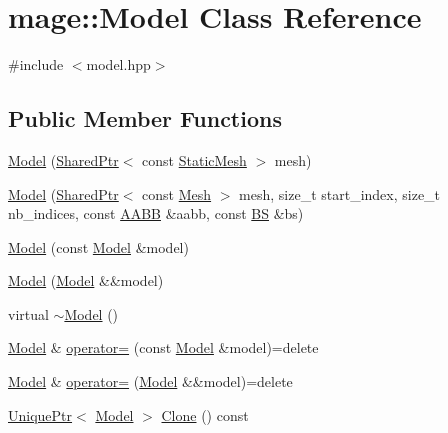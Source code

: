 \hypertarget{classmage_1_1_model}{}\section{mage\+:\+:Model Class Reference}
\label{classmage_1_1_model}


{\ttfamily \#include $<$model.\+hpp$>$}

\subsection*{Public Member Functions}
\begin{DoxyCompactItemize}
\item 
\hyperlink{classmage_1_1_model_a6f67b215aa2db0a593ef7a8ee77fb4d3}{Model} (\hyperlink{namespacemage_a1e01ae66713838a7a67d30e44c67703e}{Shared\+Ptr}$<$ const \hyperlink{classmage_1_1_static_mesh}{Static\+Mesh} $>$ mesh)
\item 
\hyperlink{classmage_1_1_model_aea937d2e26dc5549e1e93d1664b6f3b0}{Model} (\hyperlink{namespacemage_a1e01ae66713838a7a67d30e44c67703e}{Shared\+Ptr}$<$ const \hyperlink{classmage_1_1_mesh}{Mesh} $>$ mesh, size\+\_\+t start\+\_\+index, size\+\_\+t nb\+\_\+indices, const \hyperlink{structmage_1_1_a_a_b_b}{A\+A\+BB} \&aabb, const \hyperlink{structmage_1_1_b_s}{BS} \&bs)
\item 
\hyperlink{classmage_1_1_model_ac5f1d340bbfefd30bec3e6343a86059a}{Model} (const \hyperlink{classmage_1_1_model}{Model} \&model)
\item 
\hyperlink{classmage_1_1_model_a71abc57cde3bd6270de88bfa3aa47601}{Model} (\hyperlink{classmage_1_1_model}{Model} \&\&model)
\item 
virtual \hyperlink{classmage_1_1_model_af9f45ed2dcf470f85bbfd144ca9857a7}{$\sim$\+Model} ()
\item 
\hyperlink{classmage_1_1_model}{Model} \& \hyperlink{classmage_1_1_model_a563515c64ec39cfcda9f6ca37576391b}{operator=} (const \hyperlink{classmage_1_1_model}{Model} \&model)=delete
\item 
\hyperlink{classmage_1_1_model}{Model} \& \hyperlink{classmage_1_1_model_a084e30d15822bfefa79128f30a57cc02}{operator=} (\hyperlink{classmage_1_1_model}{Model} \&\&model)=delete
\item 
\hyperlink{namespacemage_a3316d7143a973e37adf1110f2e80ca31}{Unique\+Ptr}$<$ \hyperlink{classmage_1_1_model}{Model} $>$ \hyperlink{classmage_1_1_model_a39d5f0b2b83729a68569072d69113ed7}{Clone} () const
\item 

\end{DoxyCompactItemize}
